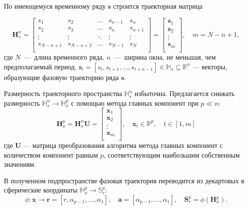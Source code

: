 \documentclass[12pt,twoside]{article}
\begin{document}
По имеющемуся временному ряду $\mathbf{s}$ строится траекторная матрица

\begin{equation*}
    \mathbf{H}_{s}^{n} = 
    \begin{bmatrix} 
    	s_{1} & s_{2} & \ldots &s_{n-1} &s_{n}\\
    	s_{2} & s_{3} & \ldots &s_{n} &s_{n+1}\\
    	\vdots& \vdots & \ddots & \vdots & \vdots\\
    	s_{N-n+1} & s_{N-n+2} &\ldots&s_{N-1} &s_{N}\\
    \end{bmatrix} = 
	\begin{bmatrix} 
      	\mathbf{s}_{1}\\
      	\mathbf{s}_{2}\\
      	\vdots\\
      	\mathbf{s}_{m}\\
   \end{bmatrix},
   \quad
   m = N-n+1,
\label{eq:hankel_matrix}
\end{equation*}
где $N$~---~длина временного ряда, $n$~---~ширина окна, не меньшая, чем предполагаемый период,  $\mathbf{s}_t=[s_{t},s_{t+1},\ldots,s_{t+n-1}] \in \mathbb{H}_{s} \subseteq \mathbb{R}^{n}$ --- векторы, образующие фазовую траекторию ряда $\mathbf{s}$.

Размерность траекторного пространства $\mathbb{H}_{s}^{n}$ избыточна.
Предлагается снижать размерность $\mathbb{H}_{s}^{n} \xrightarrow{} \mathbb{H}_{x}^{p}$ с помощью метода главных компонент при $p \ll n $:
\begin{equation}
\mathbf{H}_{x}^{p} = \mathbf{H}_{s}^{n}\mathbf{U} =
\begin{bmatrix} 
  	\mathbf{x}_{1}\\
  	\mathbf{x}_{2}\\
  	\vdots\\
  	\mathbf{x}_{m}\\
\end{bmatrix},
\quad
\mathbf{x}_{t} \in \mathbb{R}^{p},
\quad
t \in [1,m]
\label{eq:PCA}
\end{equation}
где $\mathbf{U}$ --- матрица преобразования алгоритма метода главных компонент с количеством компонент равным $p$, соответствующим наибольшим собственным значениям.

В полученном подпространстве фазовая траектория переводится из декартовых в сферические координаты $\mathbb{H}_{x}^{p} \xrightarrow{} \mathbb{S}_{r}^{p}$:
\[
    \phi: \mathbf{x} \xrightarrow{} \mathbf{r} = [r,\alpha_{p-1},\dots,\alpha_1],
    \quad
    \mathbf{a} = [\alpha_{p-1},\dots,\alpha_1],
    \quad
    \mathbf{S}_{r}^{p} = \phi(\mathbf{H}_{x}^{p}).
\]
\end{document}
